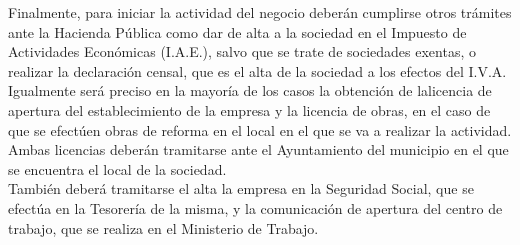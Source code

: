 Finalmente, para iniciar la actividad del negocio deberán cumplirse otros trámites  ante la Hacienda Pública como dar de alta a la sociedad en el Impuesto de Actividades Económicas (I.A.E.), salvo que se trate de sociedades exentas, o realizar la declaración censal, que es el alta de la sociedad a los efectos del I.V.A.\\
Igualmente será preciso en la mayoría de los casos la obtención de lalicencia de apertura del establecimiento de la empresa y la licencia de obras, en el caso de que se efectúen obras de reforma en el local en el que se va a realizar la actividad. Ambas licencias deberán tramitarse ante el Ayuntamiento del municipio en el que se encuentra el local de la sociedad.\\
También deberá tramitarse el alta la empresa en la Seguridad Social, que se efectúa en la Tesorería de la misma, y la comunicación de apertura del centro de trabajo, que se realiza en el Ministerio de Trabajo.\\


